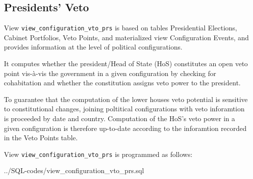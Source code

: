 \subsection{Presidents' Veto}\label{view_configuration_vto_prs}
View \texttt{\footnotesize view\_configuration\_vto\_prs} is based on tables Presidential Elections, Cabinet Portfolios, Veto Points, and materialized view Configuration Events, and provides information at the level of political configurations.

It computes whether the president/Head of State (HoS) constitutes an open veto point vis-\`a-vis the government in a given configuration by checking for cohabitation and whether the constitution assigns veto power to the president.

To guarantee that the computation of the lower houses veto potential is sensitive to constitutional changes, joining poltitical configurations with veto inforamtion is proceeded by date and country. 
Computation of the HoS's veto power in a given configuration is therefore up-to-date according to the inforamtion recorded in the Veto Points table.


View \texttt{\footnotesize view\_configuration\_vto\_prs} is programmed as follows:

%
{../SQL-codes/view_configuration_vto_prs.sql}
